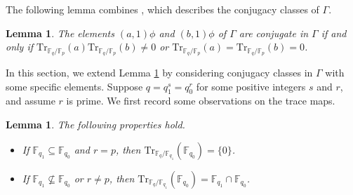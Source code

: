 \documentclass[twoside,a4paper,reqno,11pt]{amsart}
\newcommand{\<}{\langle}
\renewcommand{\>}{\rangle}
\newcommand{\Tr}{\mathrm{Tr}}
\newtheorem{lem}[thm]{Lemma}
\theoremstyle{definition}
\begin{document}
	The following lemma combines \cite[Lemmas 2.14 and 2.15]{Sh_conj_AGammaL}, which describes the conjugacy classes of $\Gamma$.
	
	\begin{lem}
		\label{l:pre_AGammaL_Sh}
		The elements $(a,1)\phi$ and $(b,1)\phi$ of $\Gamma$ are conjugate in $\Gamma$ if and only if $\Tr_{\mathbb{F}_q/\mathbb{F}_{p}}(a)\Tr_{\mathbb{F}_q/\mathbb{F}_{p}}(b)\ne 0$ or $\Tr_{\mathbb{F}_q/\mathbb{F}_{p}}(a) = \Tr_{\mathbb{F}_q/\mathbb{F}_{p}}(b) = 0$.
	\end{lem}
	
	In this section, we extend Lemma \ref{l:pre_AGammaL_Sh} by considering conjugacy classes in $\Gamma$ with some specific elements. Suppose $q = q_1^s = q_0^r$ for some positive integers $s$ and $r$, and assume $r$ is prime. We first record some observations on the trace maps.
	
	\begin{lem}
		\label{l:pre_AGammaL_trace}
		The following properties hold.
		\begin{itemize}\addtolength{\itemsep}{0.2\baselineskip}
			\item[{\rm (i)}] If $\mathbb{F}_{q_1}\subseteq\mathbb{F}_{q_0}$ and $r = p$, then $\Tr_{\mathbb{F}_q/\mathbb{F}_{q_1}}(\mathbb{F}_{q_0})=\{0\}$.
			\item[{\rm (ii)}] If $\mathbb{F}_{q_1}\not\subseteq \mathbb{F}_{q_0}$ or $r\ne p$, then $\Tr_{\mathbb{F}_q/\mathbb{F}_{q_1}}(\mathbb{F}_{q_0}) = \mathbb{F}_{q_1}\cap \mathbb{F}_{q_0}$.
		\end{itemize}
	\end{lem}
	
\end{document}
